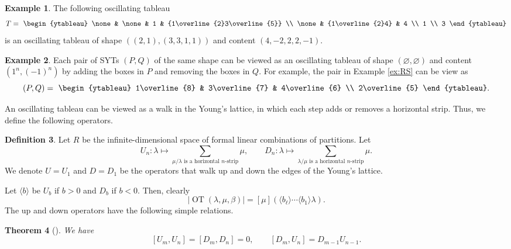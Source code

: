 \documentclass[12pt,a4paper]{article}
\newcommand{\ctab}[1]{\vcenter{\hbox{#1}}}
\theoremstyle{plain}
\newtheorem{thm}{Theorem}[section]
\theoremstyle{definition}
\newtheorem{definition}[thm]{Definition}
\newtheorem{example}[thm]{Example}
\theoremstyle{remark}
\newcommand{\OT}{\operatorname{OT}}
\begin{document}
    \begin{example}
        The following oscillating tableau
        \[
        T = ~\ctab{\begin{ytableau}
            \none & \none & 1 & {1\overline{2}3\overline{5}} \\
            \none & {1\overline{2}4} & 4 \\
            1 \\
            3
        \end{ytableau}}
        \]
        is an oscillating tableau of shape $((2,1),(3,3,1,1))$ and content $(4,-2,2,2,-1)$.
    \end{example}

    \begin{example}
        Each pair of SYTs $(P,Q)$ of the same shape can be viewed as an oscillating tableau of shape $(\varnothing,\varnothing)$ and content $(1^n,(-1)^n)$ by adding the boxes in $P$ and removing the boxes in $Q$. For example, the pair in Example \ref{ex:RS} can be view as
        \[
        (P,Q) = ~\ctab{\begin{ytableau}
            1\overline{8} & 3\overline{7} & 4\overline{6} \\
            2\overline{5}
        \end{ytableau}}.
        \]
    \end{example}

    An oscillating tableau can be viewed as a walk in the Young's lattice, in which each step adds or removes a horizontal strip. Thus, we define the following operators.

    \begin{definition}
        Let $R$ be the infinite-dimensional space of formal linear combinations of partitions. Let
        \[
        U_n:\lambda \mapsto \sum_{\text{$\mu/\lambda$ is a horizontal $n$-strip}}\mu,\qquad D_n:\lambda \mapsto \sum_{\text{$\lambda/\mu$ is a horizontal $n$-strip}}\mu.
        \]
        We denote $U = U_1$ and $D = D_1$ be the operators that walk up and down the edges of the Young's lattice.
    \end{definition}

    Let $\langle b \rangle$ be $U_b$ if $b>0$ and $D_b$ if $b < 0$. Then, clearly
    \[
    |\OT(\lambda,\mu,\beta)| = [\mu](\langle b_\ell\rangle\cdots \langle b_1\rangle \lambda).
    \]
    The up and down operators have the following simple relations.

    \begin{thm}[{\cite[Theorem 6.1]{pak1996oscillating}}]\label{thm:UDrel}
        We have
        \[
        [U_m,U_n] = [D_m,D_n] = 0,\qquad [D_m,U_n] = D_{m-1}U_{n-1}.
        \]
    \end{thm}
\end{document}
